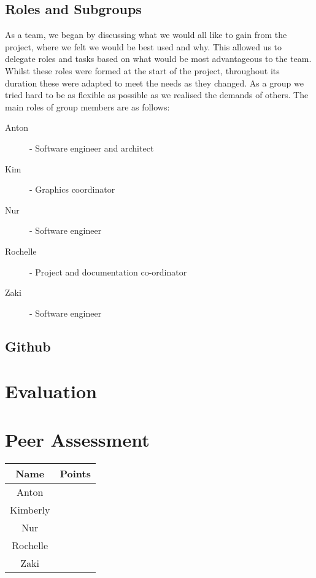 \documentclass{article}
\begin{document}
 
	\subsection{Roles and Subgroups}
	
	As a team, we began by discussing what we would all like to gain from the project, where we felt we would be best used and why. 
	This allowed us to delegate roles and tasks based on what would be most advantageous to the team. 
	Whilst these roles were formed at the start of the project, throughout its duration these were adapted to meet the needs as they changed. 
	As a group we tried hard to be as flexible as possible as we realised the demands of others.
	The main roles of group members are as follows:
	
	\begin{description}
		\item [Anton] - Software engineer and architect
		\item [Kim] - Graphics coordinator
		\item [Nur] - Software engineer
		\item [Rochelle] - Project and documentation co-ordinator
		\item [Zaki] - Software engineer
	\end{description}
	
	
	\subsection{Github}
\section{Evaluation}
	
	
\section{Peer Assessment}
\begin{tabular}{|c|c|}
	\hline Name & Points \\ 
	\hline Anton &  \\ 
	\hline Kimberly &  \\ 
	\hline Nur &  \\ 
	\hline Rochelle &  \\ 
	\hline  Zaki &  \\ 
	\hline 
\end{tabular} 
	


\end{document}
